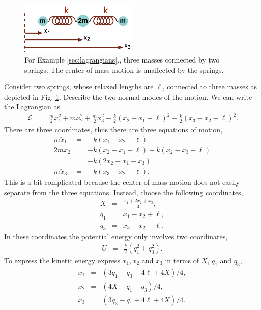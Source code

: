 \example
\begin{figure}
\centerline{\includegraphics[width=0.5\textwidth]{figs/springs}}
\caption{\label{fig:springs} For Example
  \ref{sec:lagrangians}., three masses
  connected by two springs. The center-of-mass motion is unaffected by
  the springs.}
\end{figure}
Consider two springs, whose relaxed lengths are $\ell$, connected to
three masses as depicted in Fig. \ref{fig:springs}. Describe the two
normal modes of the motion. We can write the Lagrangian as
\begin{eqnarray*}
\mathcal{L}&=&\frac{m}{2}\dot{x}_1^2+m\dot{x}_2^2+\frac{m}{2}\dot{x}_3^2
-\frac{k}{2}(x_2-x_1-\ell)^2-\frac{k}{2}(x_3-x_2-\ell)^2.
\end{eqnarray*}
There are three coordinates, thus there are three equations of motion,
\begin{eqnarray*}
m\ddot{x}_1&=&-k(x_1-x_2+\ell)\\ 2m\ddot{x}_2&=&-k(x_2-x_1-\ell)-k(x_2-x_3+\ell)\\ &=&-k(2x_2-x_1-x_3)\\ m\ddot{x}_3&=&-k(x_3-x_2+\ell).
\end{eqnarray*}
This is a bit complicated because the center-of-mass motion does not
easily separate from the three equations. Instead, choose the
following coordinates,
\begin{eqnarray*}
X&=&\frac{x_1+2x_2+x_3}{4},\\ q_1&=&x_1-x_2+\ell,\\ q_3&=&x_3-x_2-\ell.
\end{eqnarray*}
In these coordinates the potential energy only involves two
coordinates,
\begin{eqnarray*}
U&=&\frac{k}{2}(q_1^2+q_3^2).
\end{eqnarray*}
To express the kinetic energy express $x_1, x_2$ and $x_3$ in terms of
$X$, $q_1$ and $q_3$,
\begin{eqnarray*}
x_1&=&(3q_1-q_3-4\ell+4X)/4,\\ x_2&=&(4X-q_1-q_3)/4,\\ x_3&=&(3q_3-q_1+4\ell+4X)/4.
\end{eqnarray*}
